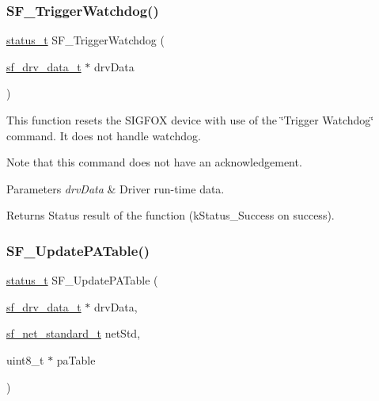 \subsubsection{\texorpdfstring{SF\_TriggerWatchdog()}{SF\_TriggerWatchdog()}}
{\footnotesize\ttfamily \mbox{\hyperlink{group__ksdk__common_gaaabdaf7ee58ca7269bd4bf24efcde092}{status\+\_\+t}} S\+F\+\_\+\+Trigger\+Watchdog (\begin{DoxyParamCaption}\item[{\mbox{\hyperlink{structsf__drv__data__t}{sf\+\_\+drv\+\_\+data\+\_\+t}} $\ast$}]{drv\+Data }\end{DoxyParamCaption})}



This function resets the S\+I\+G\+F\+OX device with use of the \char`\"{}\+Trigger Watchdog\char`\"{} command. It does not handle watchdog. 

Note that this command does not have an acknowledgement.


\begin{DoxyParams}{Parameters}
{\em drv\+Data} & Driver run-\/time data.\\
\hline
\end{DoxyParams}
\begin{DoxyReturn}{Returns}
Status result of the function (k\+Status\+\_\+\+Success on success). 
\end{DoxyReturn}
\mbox{\label{group__sf__functions__group_gac338c18f67a2ecbf5f2ce3a266b7292d}} 
\subsubsection{\texorpdfstring{SF\_UpdatePATable()}{SF\_UpdatePATable()}}
{\footnotesize\ttfamily \mbox{\hyperlink{group__ksdk__common_gaaabdaf7ee58ca7269bd4bf24efcde092}{status\+\_\+t}} S\+F\+\_\+\+Update\+P\+A\+Table (\begin{DoxyParamCaption}\item[{\mbox{\hyperlink{structsf__drv__data__t}{sf\+\_\+drv\+\_\+data\+\_\+t}} $\ast$}]{drv\+Data,  }\item[{\mbox{\hyperlink{group__sf__enum__group_ga9ad07e4b666d7d70f7a69614ecb89421}{sf\+\_\+net\+\_\+standard\+\_\+t}}}]{net\+Std,  }\item[{uint8\+\_\+t $\ast$}]{pa\+Table }\end{DoxyParamCaption})}



